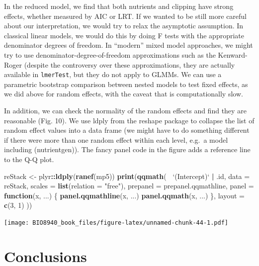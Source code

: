 \documentclass[
  12pt,
]{book}
\newenvironment{Shaded}{\begin{snugshade}}{\end{snugshade}}
\newcommand{\ControlFlowTok}[1]{\textcolor[rgb]{0.13,0.29,0.53}{\textbf{#1}}}
\newcommand{\DataTypeTok}[1]{\textcolor[rgb]{0.13,0.29,0.53}{#1}}
\newcommand{\DecValTok}[1]{\textcolor[rgb]{0.00,0.00,0.81}{#1}}
\newcommand{\KeywordTok}[1]{\textcolor[rgb]{0.13,0.29,0.53}{\textbf{#1}}}
\newcommand{\NormalTok}[1]{#1}
\newcommand{\OperatorTok}[1]{\textcolor[rgb]{0.81,0.36,0.00}{\textbf{#1}}}
\newcommand{\StringTok}[1]{\textcolor[rgb]{0.31,0.60,0.02}{#1}}
\begin{document}
In the reduced model, we find that both nutrients and clipping have strong effects, whether measured by AIC or LRT. If we wanted to be still more careful about our interpretation, we would try to relax the asymptotic assumption. In classical linear models, we would do this by doing F tests with the appropriate denominator degrees of freedom. In ``modern'' mixed model approaches, we might try to use denominator-degree-of-freedom approximations such as the Kenward-Roger (despite the controversy over these approximations, they are actually available in \texttt{lmerTest}, but they do not apply to GLMMs. We can use a parametric bootstrap comparison between nested models to test fixed effects, as we did above for random effects, with the caveat that is computationally slow.

In addition, we can check the normality of the random effects and find they are reasonable (Fig. 10). We use ldply from the reshape package to collapse the list of random effect values into a data frame (we might have to do something different if there were more than one random effect within each level, e.g.~a model including (nutrient\textbar gen)). The fancy panel code in the figure adds a reference line to the Q-Q plot.

\begin{Shaded}
\begin{Highlighting}[]
\NormalTok{reStack <-}\StringTok{ }\NormalTok{plyr}\OperatorTok{::}\KeywordTok{ldply}\NormalTok{(}\KeywordTok{ranef}\NormalTok{(mp5))}
\KeywordTok{print}\NormalTok{(}\KeywordTok{qqmath}\NormalTok{(}\OperatorTok{~}\StringTok{ `}\DataTypeTok{(Intercept)}\StringTok{`} \OperatorTok{|}\StringTok{ }\NormalTok{.id,}
  \DataTypeTok{data =}\NormalTok{ reStack, }\DataTypeTok{scales =} \KeywordTok{list}\NormalTok{(}\DataTypeTok{relation =} \StringTok{"free"}\NormalTok{),}
  \DataTypeTok{prepanel =}\NormalTok{ prepanel.qqmathline,}
  \DataTypeTok{panel =} \ControlFlowTok{function}\NormalTok{(x, ...) \{}
    \KeywordTok{panel.qqmathline}\NormalTok{(x, ...)}
    \KeywordTok{panel.qqmath}\NormalTok{(x, ...)}
\NormalTok{  \},}
  \DataTypeTok{layout =} \KeywordTok{c}\NormalTok{(}\DecValTok{3}\NormalTok{, }\DecValTok{1}\NormalTok{)}
\NormalTok{))}
\end{Highlighting}
\end{Shaded}

\texttt{[image: BIO8940\_book\_files/figure-latex/unnamed-chunk-44-1.pdf]}

\hypertarget{conclusions}{%
\chapter{Conclusions}\label{conclusions}}
\end{document}
